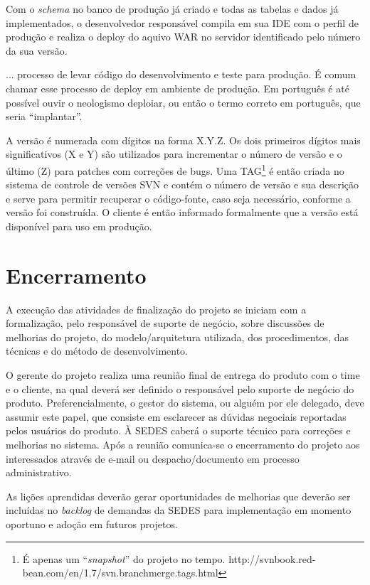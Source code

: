 Com o \textit{schema} no banco de produção já criado e todas as tabelas e dados já implementados, o desenvolvedor responsável compila em sua IDE com o perfil de produção e realiza o deploy do aquivo WAR no servidor identificado pelo número da sua versão.

\begin{citacao}
... processo de levar código do desenvolvimento e teste para produção. É comum chamar esse processo de deploy em ambiente de
produção. Em português é até possível ouvir o neologismo deploiar, ou então o termo correto em português, que seria ``implantar''. \cite[p.~19]{Sato2014}
\end{citacao}

A versão é numerada com dígitos na forma X.Y.Z. Os dois primeiros dígitos mais significativos (X e Y) são utilizados para incrementar o número de versão e o último (Z) para patches com correções de bugs. Uma  TAG\footnote{ É apenas um ``\textit{snapshot}'' do projeto no tempo. http://svnbook.red-bean.com/en/1.7/svn.branchmerge.tags.html} é então criada no sistema de controle de versões SVN e contém o número de versão e sua descrição e serve para permitir recuperar o código-fonte, caso seja necessário, conforme a versão foi construída. O cliente é então informado formalmente que a versão está disponível para uso em produção.

\section{Encerramento}
\label{sec:atividadesRealizadasEncerramento}

A execução das atividades de finalização do projeto se iniciam com a formalização, pelo responsável de suporte de negócio, sobre discussões de melhorias do projeto, do modelo/arquitetura utilizada, dos  procedimentos, das técnicas e do método de desenvolvimento. 

O gerente do projeto realiza uma reunião final de entrega do produto com o time e o cliente, na qual deverá ser definido o responsável pelo suporte de negócio do produto. Preferencialmente, o gestor do sistema, ou alguém por ele delegado, deve assumir este papel, que consiste em esclarecer as dúvidas negociais reportadas pelos usuários do produto. À SEDES caberá o suporte técnico para correções e melhorias no sistema. Após a reunião comunica-se o encerramento do projeto aos interessados através de e-mail ou despacho/documento em processo administrativo.

As lições aprendidas deverão gerar oportunidades de melhorias que deverão ser incluídas no \textit{backlog} de demandas da SEDES para implementação em momento oportuno e adoção em futuros projetos.